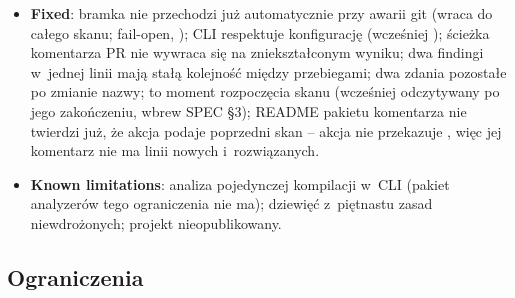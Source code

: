 \begin{itemize}[leftmargin=*]
  \item \textbf{Fixed}: bramka nie przechodzi już automatycznie przy awarii git
        (wraca do całego skanu; fail-open, ); CLI respektuje konfigurację (wcześniej
        ); ścieżka komentarza PR nie wywraca się na zniekształconym
        wyniku; dwa findingi w~jednej linii mają stałą kolejność między przebiegami; dwa zdania
        pozostałe po zmianie nazwy;  to moment rozpoczęcia skanu
        (wcześniej odczytywany po jego zakończeniu, wbrew SPEC §3); README pakietu komentarza
        nie twierdzi już, że akcja podaje poprzedni skan -- akcja nie przekazuje
        , więc jej komentarz nie ma linii nowych i~rozwiązanych.
  \item \textbf{Known limitations}: analiza pojedynczej kompilacji w~CLI (pakiet analyzerów
        tego ograniczenia nie ma); dziewięć z~piętnastu zasad niewdrożonych; projekt
        nieopublikowany.
\end{itemize}


\subsection{Ograniczenia}\label{sec:portcullis-ograniczenia}

